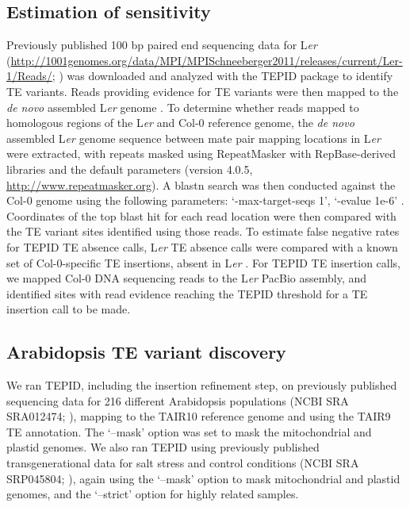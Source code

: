 \documentclass[12pt]{article}
\begin{document}
\subsection{Estimation of sensitivity}

Previously published 100 bp paired end sequencing data for L\emph{er}
(\url{http://1001genomes.org/data/MPI/MPISchneeberger2011/releases/current/Ler-1/Reads/};
\cite{Schneeberger:2011ft}) was downloaded and analyzed with the TEPID
package to identify TE variants. Reads providing evidence for TE
variants were then mapped to the \emph{de novo} assembled L\emph{er
}genome \cite{Chin:2013iw}. To determine whether reads mapped to
homologous regions of the L\emph{er} and Col-0 reference genome, the
\emph{de novo }assembled L\emph{er }genome sequence between mate pair
mapping locations in L\emph{er} were extracted, with repeats masked
using RepeatMasker with RepBase-derived libraries and the default
parameters (version 4.0.5, \url{http://www.repeatmasker.org}). A
blastn search was then conducted against the Col-0 genome using the
following parameters: `-max-target-seqs 1', `-evalue 1e-6'
\cite{Camacho:2009fc}.  Coordinates of the top blast hit for each read
location were then compared with the TE variant sites identified using
those reads. To estimate false negative rates for TEPID TE absence
calls, L\emph{er} TE absence calls were compared with a known set of
Col-0-specific TE insertions, absent in L\emph{er
}\cite{Quadrana:2016bi}. For TEPID TE insertion calls, we mapped Col-0
DNA sequencing reads \cite{Jiang:2014ih} to the L\emph{er }PacBio
assembly, and identified sites with read evidence reaching the TEPID
threshold for a TE insertion call to be made.

\subsection{Arabidopsis TE variant discovery}

We ran TEPID, including the insertion refinement step, on previously
published sequencing data for 216 different Arabidopsis populations
(NCBI SRA SRA012474; \cite{Schmitz:2013iu}), mapping to the TAIR10
reference genome and using the TAIR9 TE annotation. The `--mask' option
was set to mask the mitochondrial and plastid genomes. We also ran TEPID
using previously published transgenerational data for salt stress and
control conditions (NCBI SRA SRP045804; \cite{Jiang:2014ih}), again
using the `--mask' option to mask mitochondrial and plastid genomes, and
the `--strict' option for highly related samples.
\end{document}
